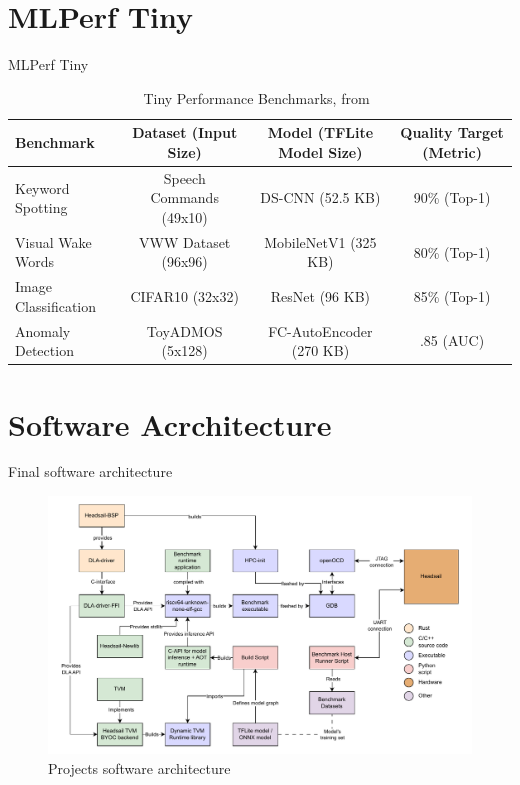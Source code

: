 \section{MLPerf Tiny}
\begin{frame}{MLPerf Tiny}
\begin{table}[ht]
\centering
\caption{Tiny Performance Benchmarks, from~\parencite{tinyperf}}
\begin{adjustbox}{max width=\textwidth}
\begin{tabular}{lccc}
  \toprule
  \textbf{Benchmark} & \textbf{Dataset (Input Size)} & \textbf{Model (TFLite Model Size)} & \textbf{Quality Target (Metric)} \\
  \midrule
  Keyword Spotting & Speech Commands (49x10) & DS-CNN (52.5 KB) & 90\% (Top-1) \\
  Visual Wake Words & VWW Dataset (96x96)  & MobileNetV1 (325 KB) & 80\% (Top-1) \\
  Image Classification & CIFAR10 (32x32) & ResNet (96 KB) & 85\% (Top-1) \\
  Anomaly Detection & ToyADMOS (5x128)  & FC-AutoEncoder (270 KB) & .85 (AUC) \\
  \bottomrule
\end{tabular}
\end{adjustbox}
\label{tab:tinyperf}
\end{table}
\end{frame}

\section{Software Acrchitecture}
\begin{frame}{Final software architecture}
  \begin{figure}
    \vfill
    \hfill
    \includegraphics[height=0.6\textheight]{../../thesis/img/dla-architecture-new.pdf}
    \caption{Projects software architecture}
  \end{figure}
\end{frame}

